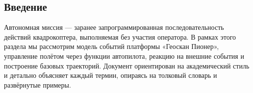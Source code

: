 \subsection{Введение}
Автономная миссия — заранее запрограммированная последовательность действий квадрокоптера, выполняемая без участия оператора. В рамках этого раздела мы рассмотрим модель событий платформы «Геоскан Пионер», управление полётом через функции автопилота, реакцию на внешние события и построение базовых траекторий. Документ ориентирован на академический стиль и детально объясняет каждый термин, опираясь на толковый словарь и развёрнутые примеры.
